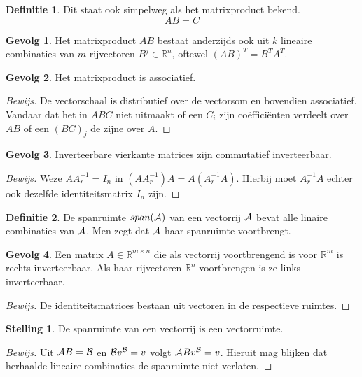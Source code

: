 \documentclass{amsart}
\theoremstyle{definition}
\newtheorem{thm}{Stelling}[section]
\newtheorem{dfn}{Definitie}[section]
\newtheorem{csq}{Gevolg}[section]
\newenvironment{bewijs}{\begin{proof}[Bewijs]}{\end{proof}}
\newcommand{\realnums}{\mathbb{R}}
\newcommand{\realn}[1][n]{\realnums^{#1}}
\newcommand{\realmx}[2][n]{\realn[#2 \times #1]}
\newcommand{\realmxn}{\realmx{m}}
\newcommand{\vecrow}[1][a]{\mathcal{\MakeUppercase{#1}}}
\begin{document}
\begin{dfn}
	Dit staat ook simpelweg als het matrixproduct bekend.
	\begin{equation*}
		AB = C
	\end{equation*}
\end{dfn}

\begin{csq}
	Het matrixproduct $AB$ bestaat anderzijds ook uit $k$ lineaire combinaties van $m$ rijvectoren $B^j \in \realn[n]$, oftewel $(AB)^T = B^TA^T$.
\end{csq}

\begin{csq}
	Het matrixproduct is associatief.
	\begin{bewijs}
		De vectorschaal is distributief over de vectorsom en bovendien associatief.
		Vandaar dat het in $ABC$ niet uitmaakt of een $C_i$ zijn coëfficiënten verdeelt over $AB$ of een $(BC)_j$ de zijne over $A$.
	\end{bewijs}
\end{csq}

\begin{csq}
	Inverteerbare vierkante matrices zijn commutatief inverteerbaar.
	\begin{bewijs}
		Weze $AA^{-1}_r = I_n$ in $(AA^{-1}_r)A = A(A^{-1}_rA)$. Hierbij moet $A^{-1}_rA$ echter ook dezelfde identiteitsmatrix $I_n$ zijn.
	\end{bewijs}
\end{csq}

\begin{dfn}
	De spanruimte $span(\vecrow)$ van een vectorrij $\vecrow$ bevat alle linaire combinaties van $\vecrow$.
	Men zegt dat $\vecrow$ haar spanruimte voortbrengt.
\end{dfn}

\begin{csq}
	Een matrix $A \in \realmxn$ die als vectorrij voortbrengend is voor $\realn[m]$ is rechts inverteerbaar.
	Als haar rijvectoren $\realn$ voortbrengen is ze links inverteerbaar.
	\begin{bewijs}
		De identiteitsmatrices bestaan uit vectoren in de respectieve ruimtes.
	\end{bewijs}
\end{csq}

\begin{thm}
	De spanruimte van een vectorrij is een vectorruimte.
	\begin{bewijs}
		Uit $\vecrow B = \vecrow[b]$ en $\vecrow[b] v^{\vecrow[b]}= v$ volgt $\vecrow B v^{\vecrow[b]}= v$.
		Hieruit mag blijken dat herhaalde lineaire combinaties de spanruimte niet verlaten.
	\end{bewijs}
\end{thm}
\end{document}
